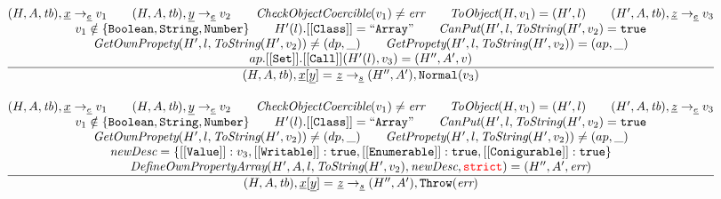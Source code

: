 \documentclass[a4paper, leqno]{amsart}
\newcommand{\rulesep}{\quad\quad}
\newcommand{\stmt}{s}
\newcommand{\expr}{e}
\newcommand{\ir}[1]{\ensuremath{\underline{#1}}}
\newcommand{\irid}{\ir{x}}
\def\inred{\color{red}}
\newcommand{\strict}{{\inred\tt strict}}
\newcommand{\true}{{\tt true}}
\newcommand{\tb}{\emph{tb}}
\newcommand{\err}{\emph{err}}
\newcommand{\hf}[1]{\emph{#1}}
\newcommand{\state}{\ensuremath{(H,A,\tb)}}
\newcommand{\evale}{\ensuremath{(H,A,\tb)}}
\def\inred{\color{red}}
\begin{document}
\[\begin{array}{l@{~~}l@{~~}ll}
\frac{\begin{matrix}
\evale, \irid \rightarrow_{\ir\expr} v_1
\rulesep
\evale, \ir{y} \rightarrow_{\ir\expr} v_2
\rulesep
\hf{CheckObjectCoercible}(v_1) \not= \err
\rulesep
\hf{ToObject}(H, v_1) = (H',l)
\rulesep
(H', A, \tb), \ir{z} \rightarrow_{\ir\expr} v_3
\\
v_1 \notin \{{\tt Boolean, String, Number}\}
\rulesep
H'(l).[[{\tt Class}]] = {\tt``Array"}%
\rulesep
\hf{CanPut}(H', l, \hf{ToString}(H', v_2) = \true
\\
\hf{GetOwnPropety}(H', l,\hf{ToString}(H', v_2)) \not= (dp, \_)
\rulesep
\hf{GetPropety}(H', l,\hf{ToString}(H', v_2)) = (ap, \_)
\\
ap.{\tt[[Set]]}.{\tt[[Call]]}(H'(l), v_3) = (H'', A', v)
\end{matrix}}{\begin{matrix}
\state, \irid{\tt[}\ir{y}{\tt] =} \ \ir{z} \rightarrow_{\ir\stmt}
(H'',A'), {\tt Normal}(v_3)
\end{matrix}}
\\[2em]


\frac{\begin{matrix}
\evale, \irid \rightarrow_{\ir\expr} v_1
\rulesep
\evale, \ir{y} \rightarrow_{\ir\expr} v_2
\rulesep
\hf{CheckObjectCoercible}(v_1) \not= \err
\rulesep
\hf{ToObject}(H, v_1) = (H',l)
\rulesep
(H', A, \tb), \ir{z} \rightarrow_{\ir\expr} v_3
\\
v_1 \notin \{{\tt Boolean, String, Number}\}
\rulesep
H'(l).[[{\tt Class}]] = {\tt``Array"}%
\rulesep
\hf{CanPut}(H', l, \hf{ToString}(H', v_2) = \true
\\
\hf{GetOwnPropety}(H', l,\hf{ToString}(H', v_2)) \not= (dp, \_)
\rulesep
\hf{GetPropety}(H', l,\hf{ToString}(H', v_2)) \not= (ap, \_)
\\
\hf{newDesc} = \{[[{\tt Value}]]:v_3, {\tt[[Writable]]}:\true,  [[{\tt Enumerable}]]:\true,  [[{\tt Conigurable}]]:\true \}
\\
\hf{DefineOwnPropertyArray}(H', A, l, \hf{ToString}(H', v_2), \hf{newDesc}, \strict) = (H'', A', \err)
\end{matrix}}{\begin{matrix}
\state, \irid{\tt[}\ir{y}{\tt] =} \ \ir{z} \rightarrow_{\ir\stmt}
(H'',A'), {\tt Throw}(\err)
\end{matrix}}
\\[2em]



\end{array}\]
\end{document}
